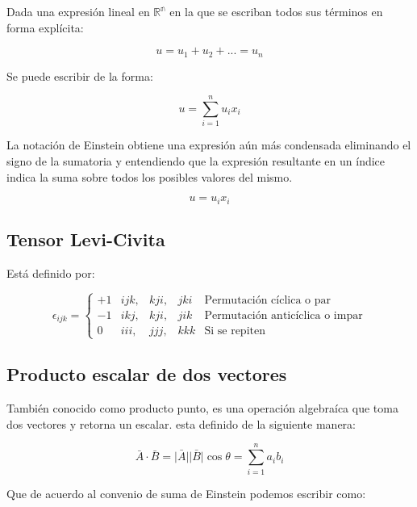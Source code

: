 \documentclass{article}
\providecommand{\abs}[1]{\lvert#1\rvert}
\begin{document}
Dada una expresión lineal en $\mathbb{R^n}$ en la que se escriban todos sus
términos en forma explícita:

\begin{equation}
    u = u_1 + u_2 + ... = u_n
\end{equation}

Se puede escribir de la forma:

\begin{equation}
    u = \sum_{i=1}^{n} u_ix_i
\end{equation}

La notación de Einstein obtiene una expresión aún más condensada eliminando el
signo de la sumatoria y entendiendo que la expresión resultante en un índice
indica la suma sobre todos los posibles valores del mismo.

\begin{equation}
    u = u_ix_i
\end{equation}

\subsection{Tensor Levi-Civita}
Está definido por:

\begin{equation}
    \epsilon_{ijk}=
    \left\lbrace\begin{array}{clllr} 
        +1 & ijk, & kji, & jki & \text{Permutación cíclica o par}\\ 
        -1 & ikj, & kji, & jik & \text{Permutación anticíclica o impar}\\
        0  & iii, & jjj, & kkk & \text{Si se repiten}
    \end{array}\right.
\end{equation}

\subsection{Producto escalar de dos vectores}

También conocido como producto punto, es una operación algebraíca que toma dos
vectores y retorna un escalar. esta definido de la siguiente manera:

\begin{equation}
    \bar{A} \cdot \bar{B}= \bar{\abs{A}} \bar{\abs{B}} \cos \theta
    = \sum_{i=1}^{n} a_i b_i
\end{equation}

Que de acuerdo al convenio de suma de Einstein podemos escribir como:
\end{document}
